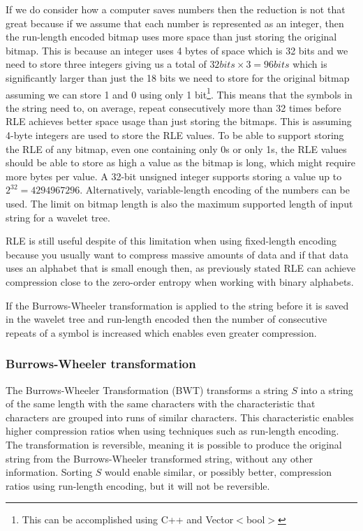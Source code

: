 If we do consider how a computer saves numbers then the reduction is not that great because if we assume that each number is represented as an integer, then the run-length encoded bitmap uses more space than just storing the original bitmap. 
This is because an integer uses 4 bytes of space which is 32 bits and we need to store three integers giving us a total of $32 bits \times 3 = 96 bits$ which is significantly larger than just the 18 bits we need to store for the original bitmap assuming we can store 1 and 0 using only 1 bit\footnote{This can be accomplished using C++ and Vector$<$bool$>$}. 
This means that the symbols in the string need to, on average, repeat consecutively more than 32 times before RLE achieves better space usage than just storing the bitmaps.
This is assuming 4-byte integers are used to store the RLE values. 
To be able to support storing the RLE of any bitmap, even one containing only 0s or only 1s, the RLE values should be able to store as high a value as the bitmap is long, which might require more bytes per value.
A 32-bit unsigned integer supports storing a value up to $2^{32} = \num{4294967296}$.
Alternatively, variable-length encoding of the numbers can be used.
The limit on bitmap length is also the maximum supported length of input string for a wavelet tree.

RLE is still useful despite of this limitation when using fixed-length encoding because you usually want to compress massive amounts of data and if that data uses an alphabet that is small enough then, as previously stated RLE can achieve compression close to the zero-order entropy when working with binary alphabets.

If the Burrows-Wheeler transformation is applied to the string before it is saved in the wavelet tree and run-length encoded then the number of consecutive repeats of a symbol is increased which enables even greater compression.

\subsubsection{Burrows-Wheeler transformation}
\label{sec:BWT}
The Burrows-Wheeler Transformation (BWT) transforms a string $S$ into a string of the same length with the same characters with the characteristic that characters are grouped into runs of similar characters.
This characteristic enables higher compression ratios when using techniques such as run-length encoding.
The transformation is reversible, meaning it is possible to produce the original string from the Burrows-Wheeler transformed string, without any other information.
Sorting $S$ would enable similar, or possibly better, compression ratios using run-length encoding, but it will not be reversible.

